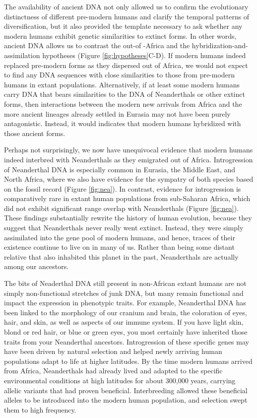 \documentclass[
]{book}
\begin{document}
The availability of ancient DNA not only allowed us to confirm the evolutionary distinctness of different pre-modern humans and clarify the temporal patterns of diversification, but it also provided the template necessary to ask whether any modern humans exhibit genetic similarities to extinct forms. In other words, ancient DNA allows us to contrast the out-of -Africa and the hybridization-and-assimilation hypotheses (Figure \ref{fig:hypotheses}C-D). If modern humans indeed replaced pre-modern forms as they dispersed out of Africa, we would not expect to find any DNA sequences with close similarities to those from pre-modern humans in extant populations. Alternatively, if at least some modern humans carry DNA that bears similarities to the DNA of Neanderthals or other extinct forms, then interactions between the modern new arrivals from Africa and the more ancient lineages already settled in Eurasia may not have been purely antagonistic. Instead, it would indicates that modern humans hybridized with those ancient forms.

Perhaps not surprisingly, we now have unequivocal evidence that modern humans indeed interbred with Neanderthals as they emigrated out of Africa. Introgression of Neanderthal DNA is especially common in Eurasia, the Middle East, and North Africa, where we also have evidence for the sympatry of both species based on the fossil record (Figure \ref{fig:nea}). In contrast, evidence for introgression is comparatively rare in extant human populations from sub-Saharan Africa, which did not exhibit significant range overlap with Neanderthals (Figure \ref{fig:nea}). These findings substantially rewrite the history of human evolution, because they suggest that Neanderthals never really went extinct. Instead, they were simply assimilated into the gene pool of modern humans, and hence, traces of their existence continue to live on in many of us. Rather than being some distant relative that also inhabited this planet in the past, Neanderthals are actually among our ancestors.

The bits of Neaderthal DNA still present in non-African extant humans are not simply non-functional stretches of junk DNA, but many remain functional and impact the expression in phenotypic traits. For example, Neanderthal DNA has been linked to the morphology of our cranium and brain, the coloration of eyes, hair, and skin, as well as aspects of our immune system. If you have light skin, blond or red hair, or blue or green eyes, you most certainly have inherited those traits from your Neanderthal ancestors. Introgression of these specific genes may have been driven by natural selection and helped newly arriving human populations adapt to life at higher latitudes. By the time modern humans arrived from Africa, Neanderthals had already lived and adapted to the specific environmental conditions at high latitudes for about 300,000 years, carrying allelic variants that had proven beneficial. Interbreeding allowed these beneficial alleles to be introduced into the modern human population, and selection swept them to high frequency.
\end{document}
